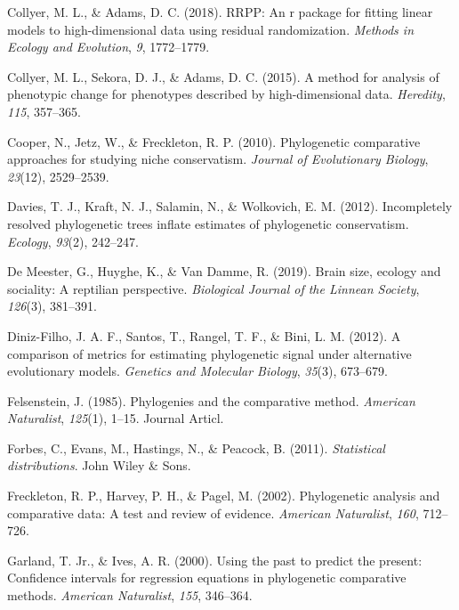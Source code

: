 \documentclass[
]{article}
\newlength{\cslhangindent}
\newenvironment{CSLReferences}[2] %
 {%
  \setlength{\parindent}{0pt}
  \ifodd #1 \everypar{\setlength{\hangindent}{\cslhangindent}}\ignorespaces\fi
  \ifnum #2 > 0
  \setlength{\parskip}{#2\baselineskip}
  \fi
 }%
 {}
\begin{document}
\begin{CSLReferences}{1}{0}
\leavevmode{}%
Collyer, M. L., \& Adams, D. C. (2018). RRPP: An r package for fitting
linear models to high-dimensional data using residual randomization.
\emph{Methods in Ecology and Evolution}, \emph{9}, 1772--1779.

\leavevmode{}%
Collyer, M. L., Sekora, D. J., \& Adams, D. C. (2015). A method for
analysis of phenotypic change for phenotypes described by
high-dimensional data. \emph{Heredity}, \emph{115}, 357--365.

\leavevmode{}%
Cooper, N., Jetz, W., \& Freckleton, R. P. (2010). Phylogenetic
comparative approaches for studying niche conservatism. \emph{Journal of
Evolutionary Biology}, \emph{23}(12), 2529--2539.

\leavevmode{}%
Davies, T. J., Kraft, N. J., Salamin, N., \& Wolkovich, E. M. (2012).
Incompletely resolved phylogenetic trees inflate estimates of
phylogenetic conservatism. \emph{Ecology}, \emph{93}(2), 242--247.

\leavevmode{}%
De Meester, G., Huyghe, K., \& Van Damme, R. (2019). Brain size, ecology
and sociality: A reptilian perspective. \emph{Biological Journal of the
Linnean Society}, \emph{126}(3), 381--391.

\leavevmode{}%
Diniz-Filho, J. A. F., Santos, T., Rangel, T. F., \& Bini, L. M. (2012).
A comparison of metrics for estimating phylogenetic signal under
alternative evolutionary models. \emph{Genetics and Molecular Biology},
\emph{35}(3), 673--679.

\leavevmode{}%
Felsenstein, J. (1985). Phylogenies and the comparative method.
\emph{American Naturalist}, \emph{125}(1), 1--15. Journal Articl.

\leavevmode{}%
Forbes, C., Evans, M., Hastings, N., \& Peacock, B. (2011).
\emph{Statistical distributions}. John Wiley \& Sons.

\leavevmode{}%
Freckleton, R. P., Harvey, P. H., \& Pagel, M. (2002). Phylogenetic
analysis and comparative data: A test and review of evidence.
\emph{American Naturalist}, \emph{160}, 712--726.

\leavevmode{}%
Garland, T. Jr., \& Ives, A. R. (2000). Using the past to predict the
present: Confidence intervals for regression equations in phylogenetic
comparative methods. \emph{American Naturalist}, \emph{155}, 346--364.


\end{CSLReferences}
\end{document}
